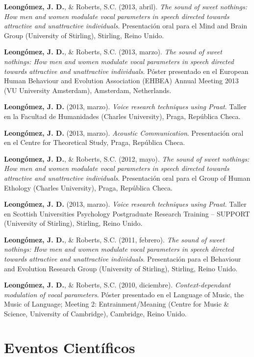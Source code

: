 \documentclass[11pt,a4paper,]{awesome-cv}
\begin{document}
\textbf{Leongómez, J. D.}, \& Roberts, S.C. (2013, abril). \emph{The
sound of sweet nothings: How men and women modulate vocal parameters in
speech directed towards attractive and unattractive individuals}.
Presentación oral para el Mind and Brain Group (University of Stirling),
Stirling, Reino Unido.

\textbf{Leongómez, J. D.}, \& Roberts, S.C. (2013, marzo). \emph{The
sound of sweet nothings: How men and women modulate vocal parameters in
speech directed towards attractive and unattractive individuals}. Póster
presentado en el European Human Behaviour and Evolution Association
(EHBEA) Annual Meeting 2013 (VU University Amsterdam), Amsterdam,
Netherlands.

\textbf{Leongómez, J. D.} (2013, marzo). \emph{Voice research techniques
using Praat}. Taller en la Facultad de Humanidades (Charles University),
Praga, República Checa.

\textbf{Leongómez, J. D.} (2013, marzo). \emph{Acoustic Communication}.
Presentación oral en el Centre for Theoretical Study, Praga, República
Checa.

\textbf{Leongómez, J. D.}, \& Roberts, S.C. (2012, mayo). \emph{The
sound of sweet nothings: How men and women modulate vocal parameters in
speech directed towards attractive and unattractive individuals}.
Presentación oral para el Group of Human Ethology (Charles University),
Praga, República Checa.

\textbf{Leongómez, J. D.} (2013, marzo). \emph{Voice research techniques
using Praat}. Taller en Scottish Universities Psychology Postgraduate
Research Training -- SUPPORT (University of Stirling), Stirling, Reino
Unido.

\textbf{Leongómez, J. D.}, \& Roberts, S.C. (2011, febrero). \emph{The
sound of sweet nothings: How men and women modulate vocal parameters in
speech directed towards attractive and unattractive individuals}.
Presentación para el Behaviour and Evolution Research Group (University
of Stirling), Stirling, Reino Unido.

\textbf{Leongómez, J. D.}, \& Roberts, S.C. (2010, diciembre).
\emph{Context-dependant modulation of vocal parameters}. Póster
presentado en el Language of Music, the Music of Language; Meeting 2:
Entrainment/Meaning (Centre for Music \& Science, University of
Cambridge), Cambridge, Reino Unido.

\endgroup

\section{Eventos Científicos}\label{eventos-cientuxedficos}
\end{document}
